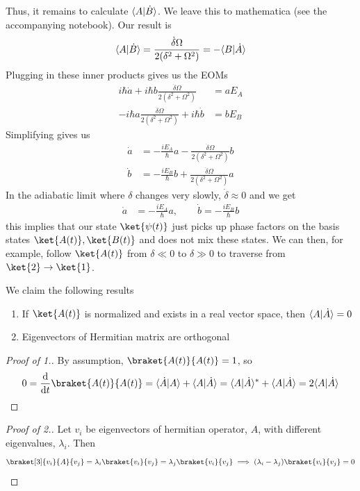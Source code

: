 \documentclass[12pt]{article}
\begin{document}
\begin{ans}
Thus, it remains to calculate $\langle A \vert \dot B \rangle$. We leave this to mathematica (see the accompanying notebook). Our result is  
\[\langle A \vert \dot B \rangle = \frac{\dot\delta\Omega}{2(\delta^2 + \Omega^2)} = -\langle B \vert \dot A \rangle\]
Plugging in these inner products gives us the EOMs 
\begin{align*}
    i \hbar \dot a  + i \hbar b  \frac{\dot\delta\Omega}{2(\delta^2 + \Omega^2)}  &= aE_A  \\
    -i\hbar a  \frac{\dot\delta\Omega}{2(\delta^2 + \Omega^2)} + i\hbar \dot b &= bE_B
\end{align*}
Simplifying gives us 
\begin{align}
    \label{eqn:1a_EOMS_for_a}
    \dot a &= - \frac{iE_A}\hbar a  - \frac{\dot\delta\Omega}{2(\delta^2 + \Omega^2)}  b\\ 
    \label{eqn:1a_EOMS_for_b}
    \dot b &= - \frac{iE_B}{\hbar} b + \frac{\dot\delta\Omega}{2(\delta^2 + \Omega^2)} a
\end{align}
In the adiabatic limit where $\delta$ changes very slowly, $\dot \delta \approx 0$ and we get
\begin{align*}
     \dot a &= - \frac{iE_A}\hbar a, \qquad \dot b = -\frac{iE_B}{\hbar} b
\end{align*}
this implies that our state $\ket{\psi(t)}$ just picks up phase factors on the basis states $\ket{A(t)}, \ket{B(t)}$ and does not mix these states. We can then, for example, follow $\ket{A(t)}$ from $\delta \ll 0$ to $\delta \gg 0$ to traverse from $\ket{2} \to \ket{1}$. 
\end{ans}

\begin{lem}
    \label{lemma:1b_linalg_results}
     We claim the following results
    \begin{enumerate}
        \item If $\ket{A(t)}$ is normalized and exists in a real vector space, then $\langle A \vert \dot A \rangle = 0$
        \item Eigenvectors of Hermitian matrix are orthogonal 
    \end{enumerate}
\end{lem}
\begin{proof}[Proof of 1.]
    By assumption, $\braket{A(t)}{A(t)} = 1$, so 
    \[0 = \odv{}{t}\braket{A(t)}{A(t)} = \ubraket{\dot A}{A} + \ubraket{A}{\dot A} = \ubraket{A}{\dot A}^* + \ubraket{A}{\dot A} = 2\ubraket{A}{\dot A}\]
\end{proof}
\begin{proof}[Proof of 2.]
    Let $v_i$ be eigenvectors of hermitian operator, $A$, with different eigenvalues, $\lambda_i$. Then 
\[\braket[3]{v_i}{A}{v_j} = \lambda_i \braket{v_i}{v_j} = \lambda_j \braket{v_i}{v_j} \implies (\lambda_i - \lambda_j)\braket{v_i}{v_j} = 0\]
\end{proof}
\end{document}
